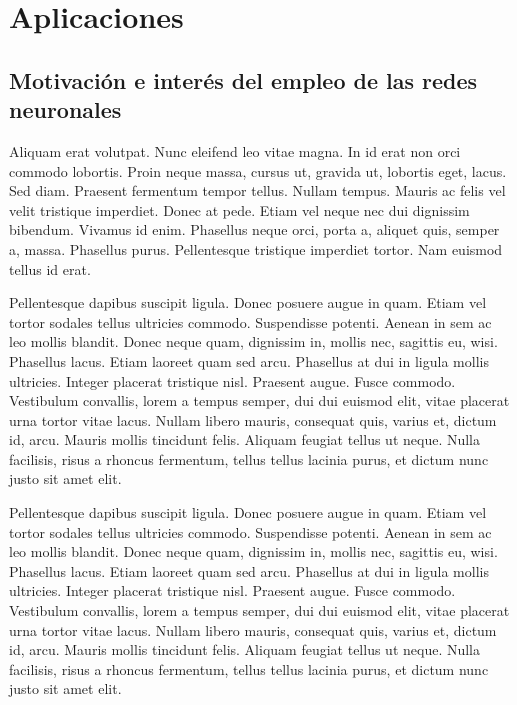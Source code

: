 \chapter{Aplicaciones}
\label{cha:resolucion}

\section{Motivación e interés del empleo de las redes neuronales}

Aliquam erat volutpat.  Nunc eleifend leo vitae magna.  In id erat non
orci commodo lobortis.  Proin neque massa, cursus ut, gravida ut,
lobortis eget, lacus.  Sed diam.  Praesent fermentum tempor tellus.
Nullam tempus.  Mauris ac felis vel velit tristique imperdiet.  Donec
at pede.  Etiam vel neque nec dui dignissim bibendum.  Vivamus id
enim.  Phasellus neque orci, porta a, aliquet quis, semper a, massa.
Phasellus purus.  Pellentesque tristique imperdiet tortor.  Nam
euismod tellus id erat.

Pellentesque dapibus suscipit ligula.  Donec posuere augue in quam.
Etiam vel tortor sodales tellus ultricies commodo.  Suspendisse
potenti.  Aenean in sem ac leo mollis blandit.  Donec neque quam,
dignissim in, mollis nec, sagittis eu, wisi.  Phasellus lacus.  Etiam
laoreet quam sed arcu.  Phasellus at dui in ligula mollis ultricies.
Integer placerat tristique nisl.  Praesent augue.  Fusce commodo.
Vestibulum convallis, lorem a tempus semper, dui dui euismod elit,
vitae placerat urna tortor vitae lacus.  Nullam libero mauris,
consequat quis, varius et, dictum id, arcu.  Mauris mollis tincidunt
felis.  Aliquam feugiat tellus ut neque.  Nulla facilisis, risus a
rhoncus fermentum, tellus tellus lacinia purus, et dictum nunc justo
sit amet elit.


Pellentesque dapibus suscipit ligula.  Donec posuere augue in quam.
Etiam vel tortor sodales tellus ultricies commodo.  Suspendisse
potenti.  Aenean in sem ac leo mollis blandit.  Donec neque quam,
dignissim in, mollis nec, sagittis eu, wisi.  Phasellus lacus.  Etiam
laoreet quam sed arcu.  Phasellus at dui in ligula mollis ultricies.
Integer placerat tristique nisl.  Praesent augue.  Fusce commodo.
Vestibulum convallis, lorem a tempus semper, dui dui euismod elit,
vitae placerat urna tortor vitae lacus.  Nullam libero mauris,
consequat quis, varius et, dictum id, arcu.  Mauris mollis tincidunt
felis.  Aliquam feugiat tellus ut neque.  Nulla facilisis, risus a
rhoncus fermentum, tellus tellus lacinia purus, et dictum nunc justo
sit amet elit.


